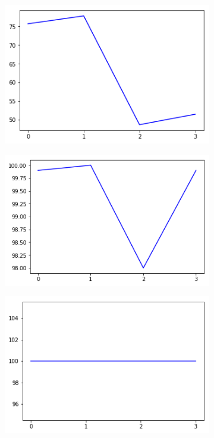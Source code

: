 \begin{figure}[h!]
  \begin{subfigure}[b]{0.3\linewidth}
    \includegraphics[width=\linewidth]{images/compl/ef0_percent.png}
    \caption{}
  \end{subfigure}
  \begin{subfigure}[b]{0.3\linewidth}
    \includegraphics[width=\linewidth]{images/compl/ef1_percent.png}
    \caption{}
  \end{subfigure}
  \begin{subfigure}[b]{0.3\linewidth}
    \includegraphics[width=\linewidth]{images/compl/ef2_percent.png}
    \caption{}
  \end{subfigure}
    

\end{figure}
